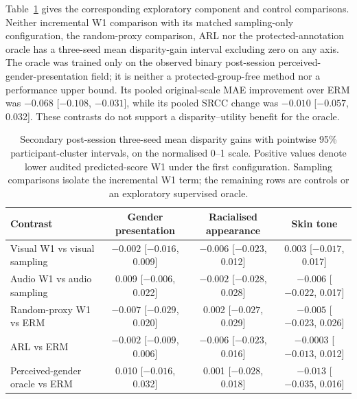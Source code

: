Table~\ref{tab:stage-c-secondary-contrasts} gives the corresponding exploratory component and
control comparisons. Neither incremental W1 comparison with its matched sampling-only
configuration, the random-proxy comparison, ARL nor the protected-annotation oracle has a
three-seed mean disparity-gain interval excluding zero on any axis. The oracle was trained only
on the observed binary post-session perceived-gender-presentation field; it is neither a
protected-group-free method nor a performance upper bound. Its pooled original-scale MAE
improvement over ERM was $-0.068$ [$-0.108$, $-0.031$], while its pooled SRCC
change was $-0.010$ [$-0.057$, 0.032]. These contrasts do not support a
disparity--utility benefit for the oracle.

\begin{table}[htbp]
\centering
\caption{Secondary post-session three-seed mean disparity gains with pointwise 95\%
participant-cluster intervals, on the normalised 0--1 scale. Positive values denote lower
audited predicted-score W1 under the first configuration. Sampling comparisons isolate the
incremental W1 term; the remaining rows are
controls or an exploratory supervised oracle.}
\label{tab:stage-c-secondary-contrasts}
\small
\begin{adjustbox}{max width=\textwidth}
\begin{tabular}{lccc}
\toprule
Contrast & Gender presentation & Racialised appearance & Skin tone \\
\midrule
Visual W1 vs visual sampling & \shortstack{$-0.002$\\{[$-0.016$, 0.009]}} & \shortstack{$-0.006$\\{[$-0.023$, 0.012]}} & \shortstack{0.003\\{[$-0.017$, 0.017]}} \\
Audio W1 vs audio sampling & \shortstack{0.009\\{[$-0.006$, 0.022]}} & \shortstack{$-0.002$\\{[$-0.028$, 0.028]}} & \shortstack{$-0.006$\\{[$-0.022$, 0.017]}} \\
Random-proxy W1 vs ERM & \shortstack{$-0.007$\\{[$-0.029$, 0.020]}} & \shortstack{0.002\\{[$-0.027$, 0.029]}} & \shortstack{$-0.005$\\{[$-0.023$, 0.026]}} \\
ARL vs ERM & \shortstack{$-0.002$\\{[$-0.009$, 0.006]}} & \shortstack{$-0.006$\\{[$-0.023$, 0.016]}} & \shortstack{$-0.0003$\\{[$-0.013$, 0.012]}} \\
Perceived-gender oracle vs ERM & \shortstack{0.010\\{[$-0.016$, 0.032]}} & \shortstack{0.001\\{[$-0.028$, 0.018]}} & \shortstack{$-0.013$\\{[$-0.035$, 0.016]}} \\
\bottomrule
\end{tabular}
\end{adjustbox}
\end{table}
\FloatBarrier

